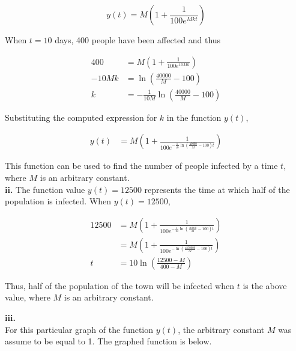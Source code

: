 \documentclass{article}
\begin{document}
    \[
        y(t) = M\left(1+\frac{1}{100e^{Mkt}}\right)
    \]

    When $t=10$ days, 400 people have been affected and thus

    \begin{align*}
        400 &= M\left(1+\frac{1}{100e^{10Mk}}\right) \\
        -10Mk&= \ln{\left(\frac{40000}{M}-100\right)} \\
        k   &= -\frac{1}{10M}\ln{\left(\frac{40000}{M}-100\right)}
    \end{align*}

    Substituting the computed expression for $k$ in the function $y(t)$,

    \begin{align*}
        y(t)    &= M\left(1+\frac{1}{100e^{-\frac{1}{10}\ln{\left(\frac{40000}{M}-100\right)}t}}\right)
    \end{align*}

    This function can be used to find the number of people infected by a time $t$, where $M$ is an arbitrary constant. \\

    \textbf{ii. } The function value $y(t) = 12500$ represents the time at which half of the population is infected. When $y(t)=12500$,

    \begin{align*}
        12500   &= M\left(1+\frac{1}{100e^{-\frac{1}{10}\ln{\left(\frac{40000}{M}-100\right)}t}}\right) \\
                &= M\left(1+\frac{1}{100e^{-\ln{\left(\frac{1250000}{M}-100\right)}t}}\right) \\
            t   &= 10\ln{\left(\frac{12500-M}{400-M}\right)}
    \end{align*}

    Thus, half of the population of the town will be infected when $t$ is the above value, where $M$ is an arbitrary constant.

    \pagebreak
    \thispagestyle{5}

    \textbf{iii. } \\
    For this particular graph of the function $y(t)$, the arbitrary constant $M$ was assume to be equal to 1. The graphed function is below.
\end{document}
